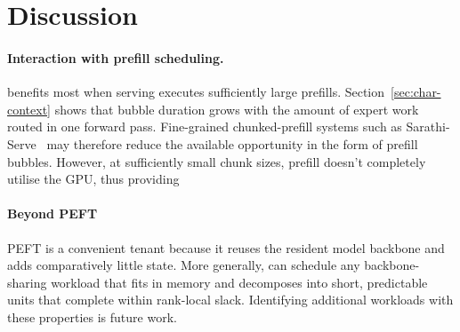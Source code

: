 \section{Discussion}
\label{sec:discussion}

\acresetall

\paragraph{Interaction with prefill scheduling.}
\sys{} benefits most when serving executes sufficiently large prefills.
Section~\ref{sec:char-context} shows that bubble duration grows with the amount of expert work routed in one forward pass. Fine-grained
chunked-prefill systems such as Sarathi-Serve~\cite{sarathi} may therefore
reduce the available opportunity in the form of prefill bubbles. However, at sufficiently small chunk sizes, prefill doesn't completely utilise the GPU, thus providing 

\paragraph{Beyond PEFT}
\ac{PEFT} is a convenient tenant because it reuses the resident model
backbone and adds comparatively little state. More generally, \sys{} can
schedule any backbone-sharing workload that fits in memory and decomposes
into short, predictable units that complete within rank-local slack.
Identifying additional workloads with these properties is future work.
